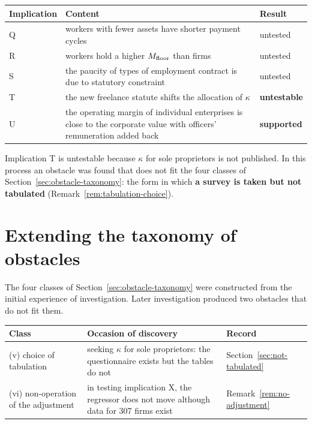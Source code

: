 \begin{center}
\begin{tabularx}{\textwidth}{@{}lXl@{}}
\toprule
Implication & Content & Result \\
\midrule
Q & workers with fewer assets have shorter payment cycles & untested \\
R & workers hold a higher $M_{\rm floor}$ than firms & untested \\
S & the paucity of types of employment contract is due to statutory constraint & untested \\
T & the new freelance statute shifts the allocation of $\kappa$ & \textbf{untestable} \\
U & the operating margin of individual enterprises is close to the corporate value with officers' remuneration added back & \textbf{supported} \\
\bottomrule
\end{tabularx}
\label{tab:worker-predictions}
\end{center}

Implication T is untestable because $\kappa$ for sole proprietors is not published. In this
process an obstacle was found that does not fit the four classes of
Section~\ref{sec:obstacle-taxonomy}: the form in which \textbf{a survey is taken but not
tabulated} (Remark~\ref{rem:tabulation-choice}).

\section{Extending the taxonomy of obstacles}

The four classes of Section~\ref{sec:obstacle-taxonomy} were constructed from the initial
experience of investigation. Later investigation produced two obstacles that do not fit them.

\begin{center}
\begin{tabularx}{\textwidth}{@{}lXl@{}}
\toprule
Class & Occasion of discovery & Record \\
\midrule
(v) choice of tabulation & seeking $\kappa$ for sole proprietors: the questionnaire exists but the tables do not & Section~\ref{sec:not-tabulated} \\
(vi) non-operation of the adjustment & in testing implication X, the regressor does not move although data for 307 firms exist & Remark~\ref{rem:no-adjustment} \\
\bottomrule
\end{tabularx}
\label{tab:obstacle-extension}
\end{center}

